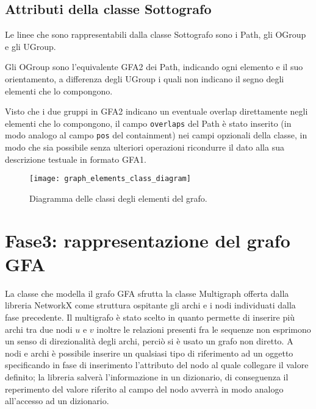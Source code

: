 \subsection{Attributi della classe Sottografo}
Le linee che sono rappresentabili dalla classe Sottografo sono i Path,
gli OGroup e gli UGroup.

Gli OGroup sono l'equivalente GFA2 dei Path, indicando ogni elemento
e il suo orientamento, a differenza degli UGroup i quali non indicano il
segno degli elementi che lo compongono.

Visto che i due gruppi in GFA2 indicano un eventuale overlap direttamente
negli elementi che lo compongono, il campo \texttt{overlaps} del Path
è stato inserito (in modo analogo al campo \texttt{pos} del containment)
nei campi opzionali della classe, in modo che sia possibile senza ulteriori operazioni
ricondurre il dato alla sua descrizione testuale in formato GFA1.

\noindent
\begin{figure}[t]
	\centering
	\texttt{[image: graph\_elements\_class\_diagram]}
	\caption[Diagramma delle classi degli elementi del grafo]{Diagramma delle classi degli elementi del grafo.}
\end{figure}
\clearpage

\section{Fase3: rappresentazione del grafo GFA}
La classe che modella il grafo GFA sfrutta la classe Multigraph offerta
dalla libreria NetworkX come struttura ospitante gli archi e i nodi individuati
dalla fase precedente. Il multigrafo è stato scelto in quanto permette
di inserire più archi tra due nodi $u$ e $v$ inoltre
le relazioni presenti fra le sequenze non esprimono un senso di direzionalità
degli archi, perciò si è usato un grafo non diretto.
A nodi e archi è possibile inserire un qualsiasi tipo di riferimento ad un oggetto specificando
in fase di inserimento l'attributo del nodo al quale collegare il valore definito; la libreria
salverà l'informazione in un dizionario, di conseguenza il reperimento del valore
riferito al campo del nodo avverrà in modo analogo all'accesso ad un dizionario.

